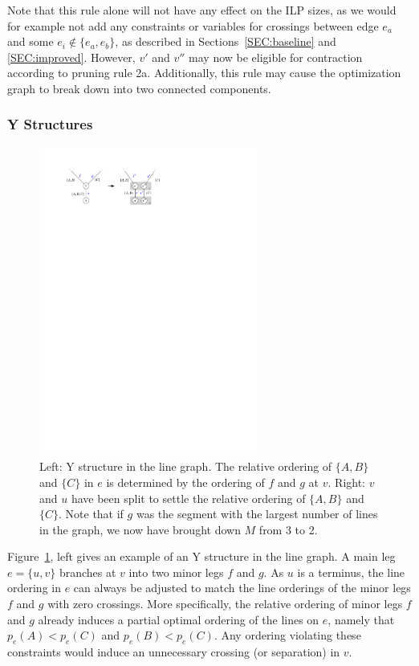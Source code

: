 \documentclass[format=acmsmall, review=false, screen=true]{acmart}
\begin{document}
Note that this rule alone will not have any effect on the ILP sizes, as we would for example not add any constraints or variables for crossings between edge $e_a$ and some $e_i \not\in \{e_a, e_b\}$, as described in Sections~\ref{SEC:baseline} and \ref{SEC:improved}.
However, $v'$ and $v''$ may now be eligible for contraction according to pruning rule 2a.
Additionally, this rule may cause the optimization graph to break down into two connected components.

\subsubsection{Y Structures}

\begin{figure}
  \centering
  \includegraphics[width=0.64\textwidth]{figures/untangling/y.pdf}
  \caption{Left: Y structure in the line graph. The relative ordering of $\{A, B\}$ and $\{C\}$ in $e$ is determined by the ordering of $f$ and $g$ at $v$. Right: $v$ and $u$ have been split to settle the relative ordering of $\{A, B\}$ and $\{C\}$. Note that if $g$ was the segment with the largest number of lines in the graph, we now have brought down $M$ from 3 to 2.}  
  \label{FIG:untangle_y}
\end{figure}

Figure~\ref{FIG:untangle_y}, left gives an example of an Y structure in the line graph.
A main leg $e = \{u, v\}$ branches at $v$ into two minor legs $f$ and $g$.
As $u$ is a terminus, the line ordering in $e$ can always be adjusted to match the line orderings of the minor legs $f$ and $g$ with zero crossings.
More specifically, the relative ordering of minor legs $f$ and $g$ already induces a partial optimal ordering of the lines on $e$, namely that $p_e(A) < p_e(C)$ and $p_e(B) < p_e(C)$.
Any ordering violating these constraints would induce an unnecessary crossing (or separation) in $v$.
\end{document}
